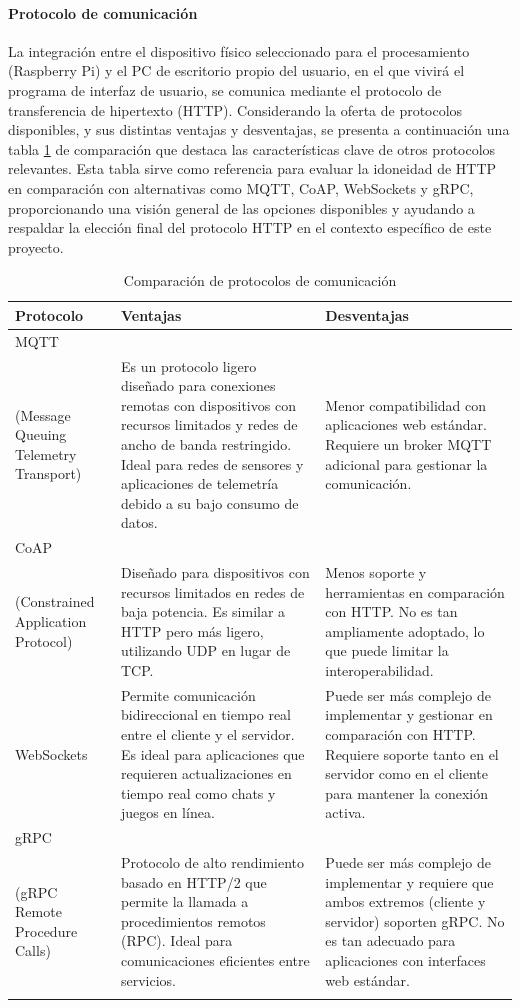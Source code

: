 \paragraph{Protocolo de comunicación}
%
La integración entre el dispositivo físico seleccionado para el procesamiento (Raspberry Pi) y el PC de escritorio propio del usuario, en el que vivirá el programa de interfaz de usuario, se comunica mediante el protocolo de transferencia de hipertexto (HTTP). Considerando la oferta de protocolos disponibles, y sus distintas ventajas y desventajas, se presenta a continuación una tabla \ref{tab:comparacion_protocolos} de comparación que destaca las características clave de otros protocolos relevantes. Esta tabla sirve como referencia para evaluar la idoneidad de HTTP en comparación con alternativas como MQTT, CoAP, WebSockets y gRPC, proporcionando una visión general de las opciones disponibles y ayudando a respaldar la elección final del protocolo HTTP en el contexto específico de este proyecto.\\
%
\begin{longtable}{|m{3cm}|m{6cm}|m{6cm}|}
\hline
\textbf{Protocolo} & \textbf{Ventajas} & \textbf{Desventajas} \\
\hline\raggedright
MQTT \cite{mqtt}\\(Message Queuing Telemetry Transport) & Es un protocolo ligero diseñado para conexiones remotas con dispositivos con recursos limitados y redes de ancho de banda restringido. Ideal para redes de sensores y aplicaciones de telemetría debido a su bajo consumo de datos. & Menor compatibilidad con aplicaciones web estándar. Requiere un broker MQTT adicional para gestionar la comunicación. \\
\hline\raggedright
CoAP \cite{coap}\\(Constrained Application Protocol) & Diseñado para dispositivos con recursos limitados en redes de baja potencia. Es similar a HTTP pero más ligero, utilizando UDP en lugar de TCP. & Menos soporte y herramientas en comparación con HTTP. No es tan ampliamente adoptado, lo que puede limitar la interoperabilidad. \\
\hline\raggedright
WebSockets \cite{websockets} & Permite comunicación bidireccional en tiempo real entre el cliente y el servidor. Es ideal para aplicaciones que requieren actualizaciones en tiempo real como chats y juegos en línea. & Puede ser más complejo de implementar y gestionar en comparación con HTTP. Requiere soporte tanto en el servidor como en el cliente para mantener la conexión activa. \\
\hline\raggedright
gRPC \cite{grpc}\\(gRPC Remote Procedure Calls) & Protocolo de alto rendimiento basado en HTTP/2 que permite la llamada a procedimientos remotos (RPC). Ideal para comunicaciones eficientes entre servicios. & Puede ser más complejo de implementar y requiere que ambos extremos (cliente y servidor) soporten gRPC. No es tan adecuado para aplicaciones con interfaces web estándar. \\
\hline
\caption{Comparación de protocolos de comunicación}
\label{tab:comparacion_protocolos}
\end{longtable}

